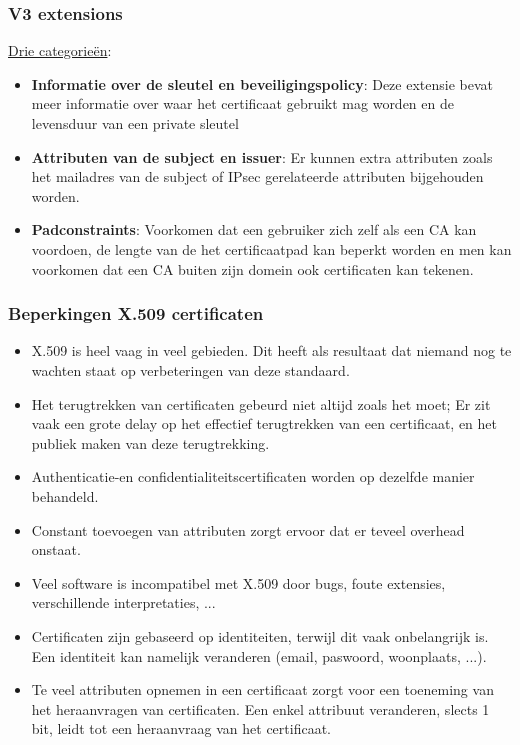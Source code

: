 \documentclass{report}
\begin{document}
	\subsubsection{V3 extensions}
	\underline{Drie categorieën}:
	\begin{itemize}
		\item[\info] \textbf{Informatie over de sleutel en beveiligingspolicy}: Deze extensie bevat meer informatie over waar het certificaat gebruikt mag worden en de levensduur van een private sleutel
		\item[\info] \textbf{Attributen van de subject en issuer}: Er kunnen extra attributen zoals het mailadres van de subject of IPsec gerelateerde attributen bijgehouden worden.
		\item[\info] \textbf{Padconstraints}: Voorkomen dat een gebruiker zich zelf als een CA kan voordoen, de lengte van de het certificaatpad kan beperkt worden en men kan voorkomen dat een CA buiten zijn domein ook certificaten kan tekenen.
	\end{itemize}

	\subsubsection{Beperkingen X.509 certificaten}
	\begin{itemize}
		\item[\alert] X.509 is heel vaag in veel gebieden. Dit heeft als resultaat dat niemand nog te wachten staat op verbeteringen van deze standaard. 
		\item[\alert] Het terugtrekken van certificaten gebeurd niet altijd zoals het moet; Er zit vaak een grote delay op het effectief terugtrekken van een certificaat, en het publiek maken van deze terugtrekking. 
		\item[\alert] Authenticatie-en confidentialiteitscertificaten worden op dezelfde manier behandeld.
		\item[\alert] Constant toevoegen van attributen zorgt ervoor dat er teveel overhead onstaat.
		\item[\alert] Veel software is incompatibel met X.509 door bugs, foute extensies, verschillende interpretaties, ...
		\item[\alert] Certificaten zijn gebaseerd op identiteiten, terwijl dit vaak onbelangrijk is. Een identiteit kan namelijk veranderen (email, paswoord, woonplaats, ...).
		\item[\alert] Te veel attributen opnemen in een certificaat zorgt voor een toeneming van het heraanvragen van certificaten. Een enkel attribuut veranderen, slects 1 bit, leidt tot een heraanvraag van het certificaat. 
	\end{itemize}
\end{document}
